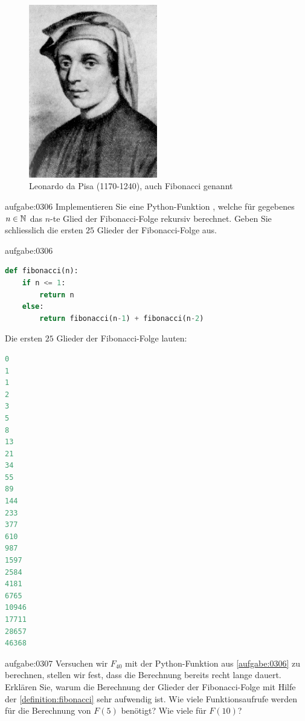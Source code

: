 \begin{figure}[H]
    \centering
    \includegraphics[width=0.5\textwidth]{Fibonacci.jpg}
    \caption{Leonardo da Pisa (1170-1240), auch Fibonacci genannt}
    \label{fig:Fibonacci}
\end{figure}

\clearpage

\begin{aufgabe}{aufgabe:0306}
Implementieren Sie eine Python-Funktion , welche für gegebenes $n\in\mathbb{N}$ das $n$-te Glied der Fibonacci-Folge rekursiv berechnet. Geben Sie schliesslich die ersten $25$ Glieder der Fibonacci-Folge aus.
\end{aufgabe}
\begin{antwort}{aufgabe:0306}
\begin{lstlisting}[language=Python,caption=rekursive Berechnung der Fibonacci-Folge]
def fibonacci(n):
    if n <= 1:
        return n
    else:
        return fibonacci(n-1) + fibonacci(n-2)
\end{lstlisting}
\noindent
Die ersten $25$ Glieder der Fibonacci-Folge lauten:
\begin{lstlisting}[language=Python,caption=Die ersten 25 Glieder der Fibonacci-Folge]
0
1
1
2
3
5
8
13
21
34
55
89
144
233
377
610
987
1597
2584
4181
6765
10946
17711
28657
46368
\end{lstlisting}
\end{antwort}

\begin{aufgabe}{aufgabe:0307}
Versuchen wir $F_{40}$ mit der Python-Funktion aus \cref{aufgabe:0306} zu berechnen, stellen wir fest, dass die Berechnung bereits recht lange dauert. Erklären Sie, warum die Berechnung der Glieder der Fibonacci-Folge mit Hilfe der \cref{definition:fibonacci} sehr aufwendig ist. Wie viele Funktionsaufrufe werden für die Berechnung von $F(5)$ benötigt? Wie viele für $F(10)$?
\end{aufgabe}

